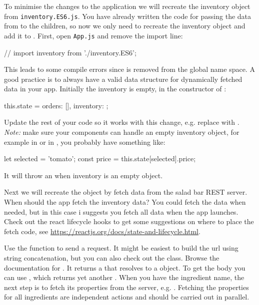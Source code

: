 \documentclass[fleqn, article, a4paper]{memoir}
\begin{document}
\begin{Assignments}
To minimise the changes to the application we will recreate the inventory object from \texttt{inventory.ES6.js}. You have already written the code for passing the data from  to the children, so now we only need to recreate the inventory object and add it to . First, open \texttt{App.js} and remove the import line:
\begin{Code}
// import inventory from './inventory.ES6';
\end{Code}
This leads to some compile errors since  is removed from the global name space. A good practice is to always have a valid data structure for dynamically fetched data in your app. Initially the inventory is empty, in the constructor of :
\begin{Code}
this.state = {orders: [], inventory: {}};
\end{Code}
Update the rest of your code so it works with this change, e.g. replace  with . \emph{Note:} make sure your components can handle an empty inventory object, for example in  or in , you probably have something like:
\begin{Code}
let selected = 'tomato';
const price = this.state[selected].price;
\end{Code}
\noindent It will throw an  when inventory is an empty object.

\item Next we will recreate the  object by fetch data from the salad bar REST server. When should the app fetch the inventory data? You could fetch the data when needed, but in this case i suggests you fetch all data when the app launches. Check out the react lifecycle hooks to get some suggestions on where to place the fetch code, see \url{https://reactjs.org/docs/state-and-lifecycle.html}.

Use the  function to send a request. It might be easiest to build the url using string concatenation, but you can also check out the  class. Browse the documentation for . It returns a  that resolves to a  object. To get the body you can use , which returns yet another . When you have the ingredient name, the next step is to fetch its properties from the server, e.g. . Fetching the properties for all ingredients are independent actions and should be carried out in parallel.


\end{Assignments}
\end{document}
